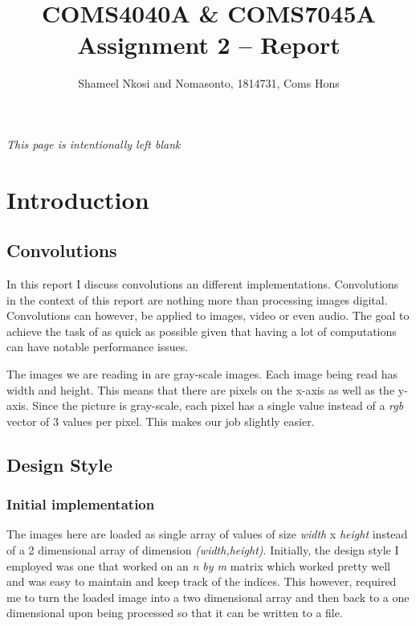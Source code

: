 

\title{COMS4040A \& COMS7045A Assignment 2 -- Report}
\author{Shameel Nkosi and Nomasonto, 1814731, Coms Hons}
\maketitle 
\pagestyle{fancy}
\fancyhf{}
\fancyhead[R]{\thepage}
\newpage
\tableofcontents
\newpage
\begin{center}
	\textit{This page is intentionally left blank}
\end{center}
\newpage
{}
\section*{Introduction}
\subsection*{Convolutions}
In this report I discuss convolutions an different implementations. Convolutions in the context of this report are nothing more than processing images digital. Convolutions can however, be applied to images, video or even audio. The goal to achieve the task of as quick as possible given that having a lot of computations can have notable performance issues.

The images we are reading in are gray-scale images. Each image being read has width and height. This means that there are pixels on the x-axis as well as the y-axis. Since the picture is gray-scale, each pixel has a single value instead of a \textit{rgb} vector of 3 values per pixel. This makes our job slightly easier. 

\subsection*{Design Style}
\subsubsection*{Initial implementation}
 The images here are loaded as single array of values of size \textit{width} x \textit{height} instead of a 2 dimensional array of dimension \textit{(width,height)}. Initially, the design style I employed was one that worked on an \textit{n by m} matrix which worked pretty well and was easy to maintain and keep track of the indices. This however, required me to turn the loaded image into a two dimensional array and then back to a one dimensional upon being processed so that it can be written to a file. 
 
